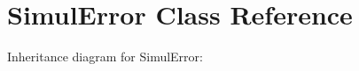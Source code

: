 \hypertarget{classSimulError}{}\section{Simul\+Error Class Reference}
\label{classSimulError}


Inheritance diagram for Simul\+Error\+:
